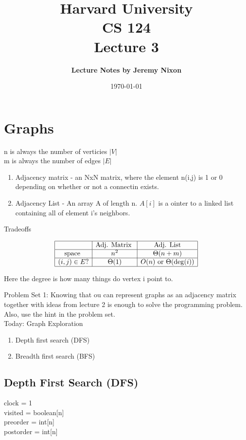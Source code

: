 \documentclass[12pt]{article}   	%
\title{\bf \large Harvard University\\ CS 124\\ \vspace{0.15in} Lecture 3}
\author{ \bf \large Lecture Notes by  Jeremy Nixon}
\date{\today}
\begin{document}
\maketitle
\section{Graphs}

n is always the number of verticies $|V|$\\
m is always the number of edges $|E|$

\begin{enumerate}
\item Adjacency matrix - an NxN matrix, where the element n(i,j) is 1 or 0 depending on whether or not a connectin exists.
\item Adjacency List - An array A of length n. $A[i]$ is a ointer to a linked list containing all of element i's neighbors.
\end{enumerate}

Tradeoffs

$$
\begin{array}{|c|c|c|}
\hline
 & \text{Adj. Matrix } & \text{ Adj. List }\\
 \hline
\text{space } & n^2 & \Theta(n+m)\\
\hline
(i,j) \in E? & \Theta(1) & O(n) \text{ or } \Theta(\deg(i))\\
\hline
\end{array}
$$

Here the degree is how many things do vertex i point to.

Problem Set 1: Knowing that ou can represent graphs as an adjacency matrix together with ideas from lecture 2 is enough to solve the programming problem. Also, use the hint in the problem set.\\


Today: Graph Exploration
\begin{enumerate}
\item Depth first search (DFS)
\item Breadth first search (BFS)
\end{enumerate}

\subsection{Depth First Search (DFS)}

clock = 1\\
visited = boolean[n]\\
preorder = int[n]\\
postorder = int[n]\\
\end{document}
